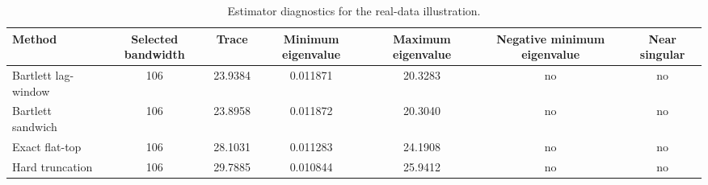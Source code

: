 \begin{table}[!htbp]
\centering
\small
\caption{Estimator diagnostics for the real-data illustration.}
\label{tab:real-estimator-diagnostics}
\begin{tabular}{lcccccc}
\toprule
Method & Selected bandwidth & Trace & Minimum eigenvalue & Maximum eigenvalue & Negative minimum eigenvalue & Near singular
 \\
\midrule
Bartlett lag-window & 106 & 23.9384 & 0.011871 & 20.3283 & no & no
 \\
Bartlett sandwich & 106 & 23.8958 & 0.011872 & 20.3040 & no & no
 \\
Exact flat-top & 106 & 28.1031 & 0.011283 & 24.1908 & no & no
 \\
Hard truncation & 106 & 29.7885 & 0.010844 & 25.9412 & no & no
 \\
\bottomrule
\end{tabular}
\end{table}
